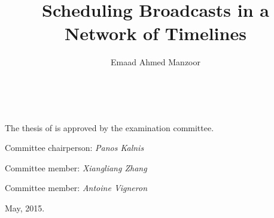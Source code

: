 \documentclass[onesided,letterpaper]{tufte-book}
\title{Scheduling Broadcasts in a Network of Timelines}
\author[Emaad Ahmed Manzoor]{Emaad Ahmed Manzoor}
\newcommand{\openepigraph}[2]{%
  \begin{fullwidth}
  \sffamily\large
  \begin{doublespace}
  \noindent\allcaps{#1}\\%
  \noindent\allcaps{#2}%
  \end{doublespace}
  \end{fullwidth}
}
\newcommand{\blankpage}{\newpage\hbox{}\thispagestyle{empty}\newpage}
\begin{document}
\let\cleardoublepage\clearpage

\frontmatter




\maketitle


\setlength{\parindent}{0pt}
\setlength{\parskip}{\baselineskip}

\chapter[Examination Committee Approval]{}
\thispagestyle{fancy}
\begin{fullwidth}
~\vfill

The thesis of \textit{\thanklessauthor} is approved by the examination committee.

Committee chairperson: \textit{Panos Kalnis}\hfill\underline{\hspace{10pc}}

Committee member: \textit{Xiangliang Zhang}\hfill\underline{\hspace{10pc}}

Committee member: \textit{Antoine Vigneron}\hfill\underline{\hspace{10pc}}

May, 2015.

\end{fullwidth}
\end{document}
